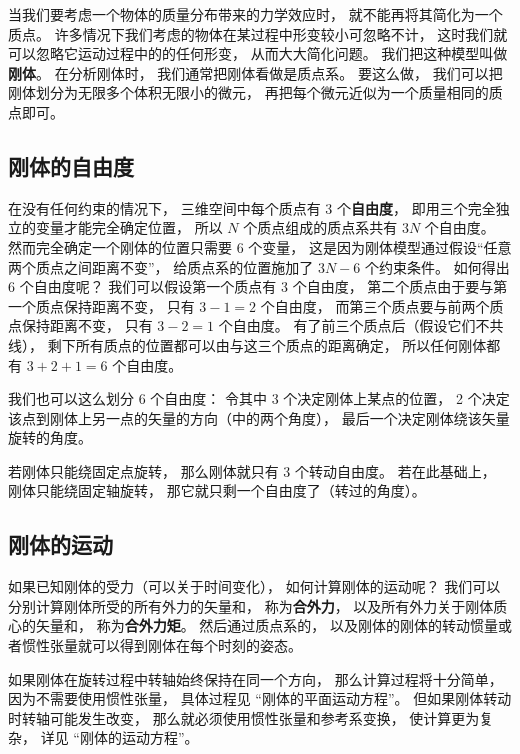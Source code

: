 

当我们要考虑一个物体的质量分布带来的力学效应时， 就不能再将其简化为一个质点。 许多情况下我们考虑的物体在某过程中形变较小可忽略不计， 这时我们就可以忽略它运动过程中的的任何形变， 从而大大简化问题。 我们把这种模型叫做\textbf{刚体}。 在分析刚体时， 我们通常把刚体看做是质点系。 要这么做， 我们可以把刚体划分为无限多个体积无限小的微元， 再把每个微元近似为一个质量相同的质点即可。 

\subsection{刚体的自由度}

在没有任何约束的情况下， 三维空间中每个质点有 3 个\textbf{自由度}， 即用三个完全独立的变量才能完全确定位置， 所以 $N$ 个质点组成的质点系共有 $3N$ 个自由度。 然而完全确定一个刚体的位置只需要 6 个变量， 这是因为刚体模型通过假设“任意两个质点之间距离不变”， 给质点系的位置施加了 $3N - 6$ 个约束条件。 如何得出 6 个自由度呢？ 我们可以假设第一个质点有 3 个自由度， 第二个质点由于要与第一个质点保持距离不变， 只有 $3 - 1 = 2$ 个自由度， 而第三个质点要与前两个质点保持距离不变， 只有 $3 - 2 = 1$ 个自由度。 有了前三个质点后（假设它们不共线）， 剩下所有质点的位置都可以由与这三个质点的距离确定， 所以任何刚体都有 $3 + 2 + 1 = 6$ 个自由度。

我们也可以这么划分 6 个自由度： 令其中 3 个决定刚体上某点的位置， 2 个决定该点到刚体上另一点的矢量的方向（中的两个角度）， 最后一个决定刚体绕该矢量旋转的角度。

若刚体只能绕固定点旋转， 那么刚体就只有 3 个转动自由度。 若在此基础上， 刚体只能绕固定轴旋转， 那它就只剩一个自由度了（转过的角度）。

\subsection{刚体的运动}
如果已知刚体的受力（可以关于时间变化）， 如何计算刚体的运动呢？ 我们可以分别计算刚体所受的所有外力的矢量和， 称为\textbf{合外力}， 以及所有外力关于刚体质心的矢量和， 称为\textbf{合外力矩}。 然后通过质点系的， 以及刚体的刚体的转动惯量或者惯性张量就可以得到刚体在每个时刻的姿态。

如果刚体在旋转过程中转轴始终保持在同一个方向， 那么计算过程将十分简单， 因为不需要使用惯性张量， 具体过程见 “刚体的平面运动方程”。 但如果刚体转动时转轴可能发生改变， 那么就必须使用惯性张量和参考系变换， 使计算更为复杂， 详见 “刚体的运动方程”。
